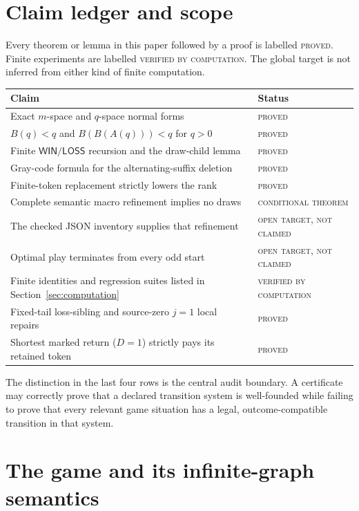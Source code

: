 \documentclass[11pt]{article}
\theoremstyle{definition}
\newcommand{\Win}{\mathsf{WIN}}
\newcommand{\Loss}{\mathsf{LOSS}}
\newcommand{\proved}{\textsc{proved}}
\newcommand{\verified}{\textsc{verified by computation}}
\newcommand{\conditional}{\textsc{conditional theorem}}
\newcommand{\openstatus}{\textsc{open target, not claimed}}
\begin{document}
\tableofcontents

\section{Claim ledger and scope}

Every theorem or lemma in this paper followed by a proof is labelled
\proved.  Finite experiments are labelled \verified.  The global target is
not inferred from either kind of finite computation.

\begin{center}
\begin{tabular}{p{}p{}}
\hline
Claim & Status \\
\hline
Exact $m$-space and $q$-space normal forms & \proved \\
$B(q)<q$ and $B(B(A(q)))<q$ for $q>0$ & \proved \\
Finite $\Win/\Loss$ recursion and the draw-child lemma & \proved \\
Gray-code formula for the alternating-suffix deletion & \proved \\
Finite-token replacement strictly lowers the rank & \proved \\
Complete semantic macro refinement implies no draws & \conditional \\
The checked JSON inventory supplies that refinement & \openstatus \\
Optimal play terminates from every odd start & \openstatus \\
Finite identities and regression suites listed in Section~\ref{sec:computation}
  & \verified \\
Fixed-tail loss-sibling and source-zero $j=1$ local repairs & \proved \\
Shortest marked return ($D=1$) strictly pays its retained token & \proved \\
\hline
\end{tabular}
\end{center}

The distinction in the last four rows is the central audit boundary.  A
certificate may correctly prove that a declared transition system is
well-founded while failing to prove that every relevant game situation has a
legal, outcome-compatible transition in that system.

\section{The game and its infinite-graph semantics}
\end{document}
